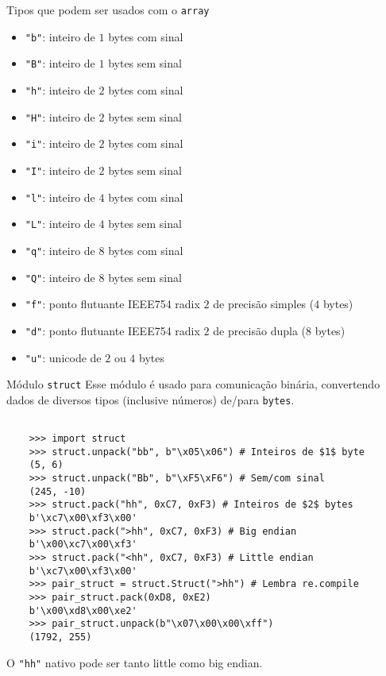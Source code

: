 \documentclass[utf8]{beamer}
\begin{document}
\begin{frame}{Tipos que podem ser usados com o \texttt{array}}
  \begin{itemize}
    \item \texttt{"b"}: inteiro de $1$ bytes com sinal
    \item \texttt{"B"}: inteiro de $1$ bytes sem sinal
    \item \texttt{"h"}: inteiro de $2$ bytes com sinal
    \item \texttt{"H"}: inteiro de $2$ bytes sem sinal
    \item \texttt{"i"}: inteiro de $2$ bytes com sinal
    \item \texttt{"I"}: inteiro de $2$ bytes sem sinal
    \item \texttt{"l"}: inteiro de $4$ bytes com sinal
    \item \texttt{"L"}: inteiro de $4$ bytes sem sinal
    \item \texttt{"q"}: inteiro de $8$ bytes com sinal
    \item \texttt{"Q"}: inteiro de $8$ bytes sem sinal
    \item \texttt{"f"}: ponto flutuante IEEE754 radix $2$
                                    de precisão simples ($4$ bytes)
    \item \texttt{"d"}: ponto flutuante IEEE754 radix $2$
                                    de precisão dupla ($8$ bytes)
    \item \texttt{"u"}: unicode de $2$ ou $4$ bytes
  \end{itemize}
\end{frame}


\begin{frame}[fragile]{Módulo \texttt{struct}}
  Esse módulo é usado para comunicação binária,
  convertendo dados de diversos tipos (inclusive números)
  de/para \texttt{bytes}.

  \begin{verbatim}

    >>> import struct
    >>> struct.unpack("bb", b"\x05\x06") # Inteiros de $1$ byte
    (5, 6)
    >>> struct.unpack("Bb", b"\xF5\xF6") # Sem/com sinal
    (245, -10)
    >>> struct.pack("hh", 0xC7, 0xF3) # Inteiros de $2$ bytes
    b'\xc7\x00\xf3\x00'
    >>> struct.pack(">hh", 0xC7, 0xF3) # Big endian
    b'\x00\xc7\x00\xf3'
    >>> struct.pack("<hh", 0xC7, 0xF3) # Little endian
    b'\xc7\x00\xf3\x00'
    >>> pair_struct = struct.Struct(">hh") # Lembra re.compile
    >>> pair_struct.pack(0xD8, 0xE2)
    b'\x00\xd8\x00\xe2'
    >>> pair_struct.unpack(b"\x07\x00\x00\xff")
    (1792, 255)

  \end{verbatim}

  O \texttt{"hh"} nativo
  pode ser tanto little como big endian.

\end{frame}
\end{document}
